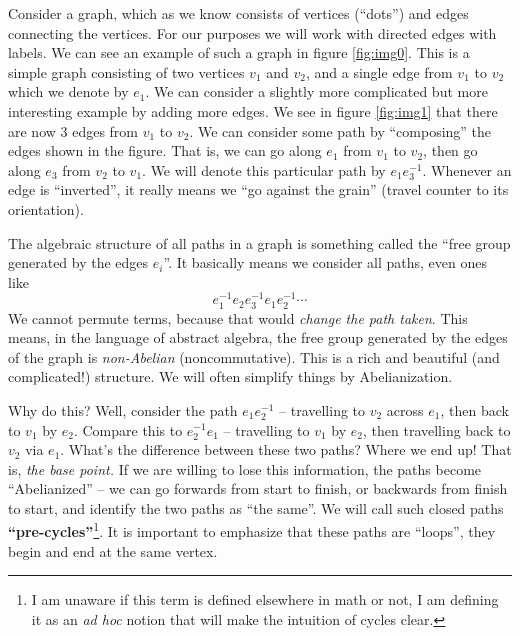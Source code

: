 
Consider a graph, which as we know consists of vertices
(``dots'') and edges connecting the vertices. For our purposes we
will work with directed edges with labels. We can see an example
of such a graph in figure \ref{fig:img0}. This is a simple graph
consisting of two vertices $v_{1}$ and $v_{2}$, and a single edge
from $v_{1}$ to $v_{2}$ which we denote by $e_{1}$. We can
consider a slightly more complicated but more interesting example
by adding more edges. We see in figure \ref{fig:img1} that there
are now 3 edges from $v_{1}$ to $v_{2}$. We can consider some
path by ``composing'' the edges shown in the figure. That is, we
can go along $e_{1}$ from $v_{1}$ to $v_{2}$, then go along
$e_{3}$ from $v_{2}$ to $v_{1}$. We will denote this particular
path by $e_{1}e_{3}^{-1}$. 
Whenever an edge is ``inverted'', it really means we ``go against
the grain'' (travel counter to its orientation).

The algebraic structure of all paths in a graph is something
called the ``free group generated by the edges $e_{i}$''. It
basically means we consider all paths, even ones like
\begin{equation}%
e_{1}^{-1}e_{2}e_{3}^{-1}e_{1}e_{2}^{-1}\cdots
\end{equation}
We cannot permute terms, because that would \emph{change the path taken}.
This means, in the language of abstract algebra, the free group
generated by the edges of the graph is \emph{non-Abelian}
(noncommutative). This is a rich and beautiful (and complicated!)
structure. We will often simplify things by Abelianization.

Why do this? Well, consider the path $e_{1}e_{2}^{-1}$ --
travelling to $v_{2}$ across $e_{1}$, then back to $v_{1}$ by
$e_{2}$. Compare this to $e_{2}^{-1}e_{1}$ -- travelling to
$v_{1}$ by $e_{2}$, then travelling back to $v_{2}$ via
$e_{1}$. What's the difference between these two paths? Where we
end up! That is, \emph{the base point.} If we are willing to lose
this information, the paths become ``Abelianized'' -- we can go
forwards from start to finish, or backwards from finish to start,
and identify the two paths as ``the same''. We will call such
closed paths \textbf{``pre-cycles''}\footnote{I am unaware if this term
  is defined elsewhere in math or not, I am defining it as an
  \emph{ad hoc} notion that will make the intuition of cycles clear.}.
It is important to emphasize that these paths are ``loops'', they
begin and end at the same vertex.

